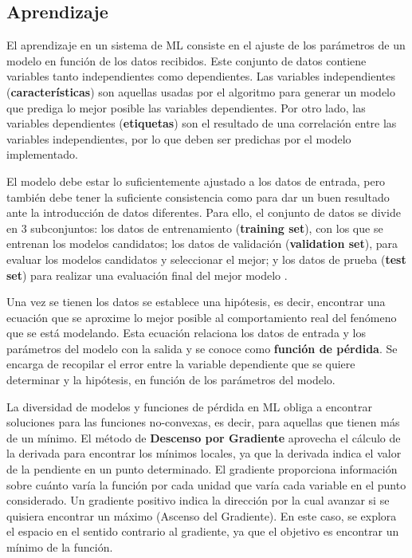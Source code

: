  \subsection{Aprendizaje}\label{1-Learning}
 
 El aprendizaje en un sistema de ML consiste en el ajuste de los parámetros de un modelo en función de los datos recibidos. Este conjunto de datos contiene variables tanto independientes como dependientes. Las variables  independientes (\textbf{características}) son aquellas usadas por el algoritmo para generar un modelo que prediga lo mejor posible las variables dependientes. Por otro lado, las variables dependientes (\textbf{etiquetas}) son el resultado de una correlación entre las variables independientes, por lo que deben ser predichas por el modelo implementado. 
 
 El modelo debe estar lo suficientemente ajustado a los datos de entrada, pero también debe tener la suficiente consistencia como para dar un buen resultado ante la introducción de datos diferentes. Para ello, el conjunto de datos se divide en 3 subconjuntos: los datos de entrenamiento (\textbf{training set}), con los que se entrenan los modelos candidatos; los datos de validación (\textbf{validation set}), para evaluar los modelos candidatos y seleccionar el mejor; y los datos de prueba (\textbf{test set}) para realizar una evaluación final del mejor modelo \cite{PeterNorvig}.
 
 Una vez se tienen los datos se establece una hipótesis, es decir, encontrar una ecuación que se aproxime lo mejor posible al comportamiento real del fenómeno que se está  modelando. Esta ecuación relaciona los datos de entrada y los parámetros del modelo con la salida y se conoce como \textbf{función de pérdida}. Se encarga de recopilar el error entre la variable dependiente que se quiere determinar y la hipótesis, en función de los parámetros del modelo.
 
 La diversidad de modelos y funciones de pérdida en ML obliga a encontrar soluciones para las funciones no-convexas, es decir, para aquellas que tienen más de un mínimo.  El método de \textbf{Descenso por Gradiente} aprovecha el cálculo de la derivada para encontrar los mínimos locales, ya que la derivada indica el valor de la pendiente en un punto determinado. El gradiente proporciona información sobre cuánto varía la función por cada unidad que varía cada variable en el punto considerado. Un gradiente positivo indica la dirección por la cual avanzar si se quisiera encontrar un máximo
 (Ascenso del Gradiente). En este caso, se explora el espacio en el sentido contrario al gradiente, ya que el objetivo es encontrar un mínimo de la función.
 
